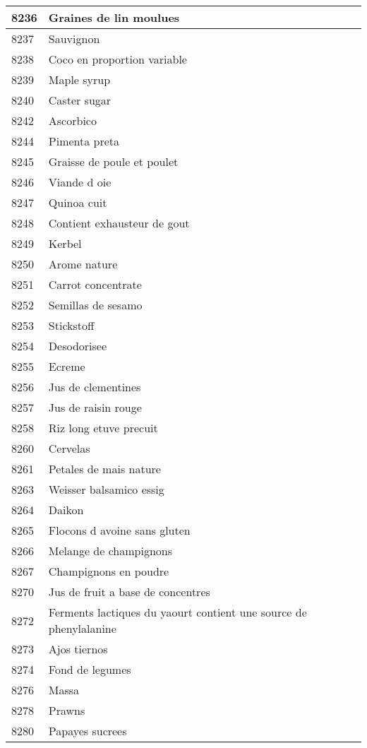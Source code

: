 \begin{longtable}{|l|l|}
8236 & Graines de lin moulues \\ \hline 
8237 & Sauvignon \\ \hline 
8238 & Coco en proportion variable \\ \hline 
8239 & Maple syrup \\ \hline 
8240 & Caster sugar \\ \hline 
8242 & Ascorbico \\ \hline 
8244 & Pimenta preta \\ \hline 
8245 & Graisse de poule et poulet \\ \hline 
8246 & Viande d oie \\ \hline 
8247 & Quinoa cuit \\ \hline 
8248 & Contient exhausteur de gout \\ \hline 
8249 & Kerbel \\ \hline 
8250 & Arome nature \\ \hline 
8251 & Carrot concentrate \\ \hline 
8252 & Semillas de sesamo \\ \hline 
8253 & Stickstoff \\ \hline 
8254 & Desodorisee \\ \hline 
8255 & Ecreme \\ \hline 
8256 & Jus de clementines \\ \hline 
8257 & Jus de raisin rouge \\ \hline 
8258 & Riz long etuve precuit \\ \hline 
8260 & Cervelas \\ \hline 
8261 & Petales de mais nature \\ \hline 
8263 & Weisser balsamico essig \\ \hline 
8264 & Daikon \\ \hline 
8265 & Flocons d avoine sans gluten \\ \hline 
8266 & Melange de champignons \\ \hline 
8267 & Champignons en poudre \\ \hline 
8270 & Jus de fruit a base de concentres \\ \hline 
8272 & Ferments lactiques du yaourt contient une source de phenylalanine \\ \hline 
8273 & Ajos tiernos \\ \hline 
8274 & Fond de legumes \\ \hline 
8276 & Massa \\ \hline 
8278 & Prawns \\ \hline 
8280 & Papayes sucrees \\ \hline 

\end{longtable}

